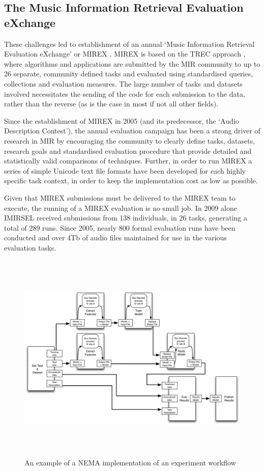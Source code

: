 \documentclass[conference]{IEEEtran}
\begin{document}
\subsection{The Music Information Retrieval Evaluation eXchange}
These challenges led to establishment of an annual `Music Information Retrieval Evaluation eXchange'  or MIREX  \cite{downie2008mirex}. MIREX is based on the TREC approach \cite{taguesutcliffe1995sat}, where algorithms and applications are submitted by the MIR community to up to 26 separate, community defined tasks and evaluated using standardised queries, collections and evaluation measures. The large number of tasks and datasets involved necessitates the sending of the code for each submission to the data, rather than the reverse (as is the case in most if not all other fields). 

Since the establishment of MIREX in 2005 (and its predecessor, the `Audio Description Contest'), the annual evaluation campaign has been a strong driver of research in MIR by encouraging the community to clearly define tasks, datasets, research goals and standardised evaluation procedure that provide detailed and statistically valid comparisons of techniques. Further, in order to run MIREX a series of simple Unicode text file formats have been developed for each highly specific task context, in order to keep the implementation cost as low as possible.

Given that MIREX submissions must be delivered to the MIREX team to execute, the running of a MIREX evaluation is no small job. In 2009 alone IMIRSEL received submissions from 138 individuals, in 26 tasks, generating a total of 289 runs.  Since 2005, nearly 800 formal evaluation runs have been conducted and over 4Tb of audio files maintained for use in the various evaluation tasks. 

\begin{figure}[t]
\centering
\includegraphics[height=4in]{flow_example}
  \caption{An example of a NEMA implementation of an experiment workflow}
\label{fig_flow}
\end{figure}
\end{document}
